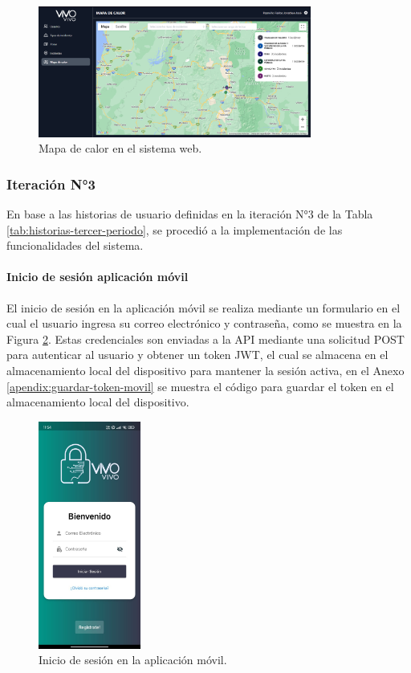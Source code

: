 \begin{figure}[H]
    \centering
    \includegraphics[width=0.8\textwidth]{chapters/III-resultados-y-discusion/resources/images/mapa-de-calor-web.png}
    \caption{Mapa de calor en el sistema web.}
    \label{fig:mapa-de-calor-web}
\end{figure}

\subsubsection{Iteración N°3}

En base a las historias de usuario definidas en la iteración N°3 de la Tabla \ref{tab:historias-tercer-periodo}, se procedió a la implementación
de las funcionalidades del sistema.

\paragraph{Inicio de sesión aplicación móvil}
El inicio de sesión en la aplicación móvil se realiza mediante un formulario en el cual el usuario ingresa su correo electrónico y
contraseña, como se muestra en la Figura \ref{fig:inicio-sesion-movil}. Estas credenciales son enviadas a la API mediante una solicitud
POST para autenticar al usuario y obtener un token JWT, el cual se almacena en el almacenamiento local del dispositivo para mantener
la sesión activa, en el Anexo \ref{apendix:guardar-token-movil} se muestra el código para guardar el token en el almacenamiento local del
dispositivo.

\begin{figure}[H]
    \centering
    \includegraphics[width=0.3\textwidth]{chapters/III-resultados-y-discusion/resources/images/inicio-sesion-movil.png}
    \caption{Inicio de sesión en la aplicación móvil.}
    \label{fig:inicio-sesion-movil}
\end{figure}

